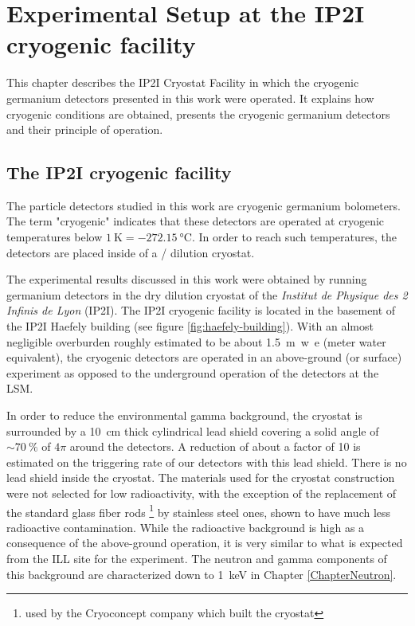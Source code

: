
\chapter{Experimental Setup at the IP2I cryogenic facility} %

\label{ChapterExperiment} %


This chapter describes the IP2I Cryostat Facility in which the cryogenic germanium detectors presented in this work were operated. It explains how cryogenic conditions are obtained, presents the cryogenic germanium detectors and their principle of operation.

\section{The IP2I cryogenic facility}
\label{sec:IP2I-cryostat-facility} 

The particle detectors studied in this work are cryogenic germanium bolometers. The term "cryogenic" indicates that these detectors are operated at cryogenic temperatures below $\SI{1}{\kelvin} = \SI{-272,15}{\celsius}$. In order to reach such temperatures, the detectors are placed inside of a / dilution cryostat.

The experimental results discussed in this work were obtained by running germanium detectors in the dry dilution cryostat of the \textit{Institut de Physique des 2 Infinis de Lyon} (IP2I). The IP2I cryogenic facility is located in the basement of the IP2I Haefely building (see figure \ref{fig:haefely-building}). With an almost negligible overburden roughly estimated to be about \SI{1.5}{m.w.e} (meter water equivalent), the cryogenic detectors are operated in an above-ground (or surface) experiment as opposed to the underground operation of the \Edelweiss{} detectors at the LSM.

In order to reduce the environmental gamma background, the cryostat is surrounded by a \SI{10}{\cm} thick cylindrical lead shield covering a solid angle of $\sim \SI{70}{\percent}$ of $4\pi$ around the detectors. A reduction of about a factor of 10 is estimated on the triggering rate of our detectors with this lead shield.
There is no lead shield inside the cryostat. The materials used for the cryostat construction were not selected for low radioactivity, with the exception of the replacement of the standard glass fiber rods \footnote{used by the Cryoconcept company which built the cryostat} by stainless steel ones, shown to have much less radioactive contamination. 
While the radioactive background is high as a consequence of the above-ground operation, it is very similar to what is expected from the ILL site for the \Ricochet{} experiment. The neutron and gamma components of this background are characterized down to \SI{1}{\kilo\eV} in Chapter \ref{ChapterNeutron}.

